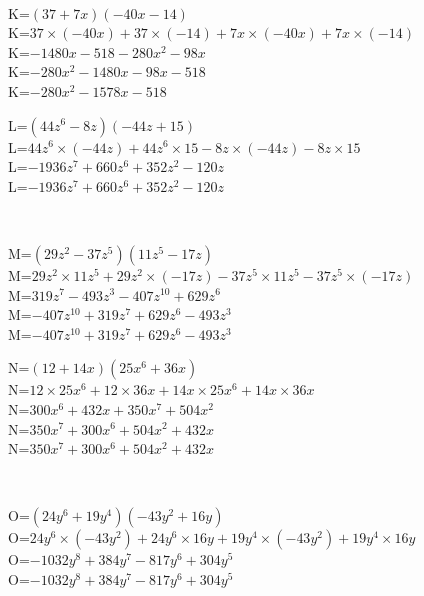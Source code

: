\documentclass{article}%
\begin{document}
\\%
\begin{minipage}{0.5\textwidth}%
K=$(37+7x)(-40x-14)$\\%
K=$37 \times (-40x)+37 \times (-14)+7x \times (-40x)+7x \times (-14)$\\%
K=$-1480x-518-280x^2-98x$\\%
K=$-280x^2-1480x-98x-518$\\%
K=$-280x^2-1578x-518$\\%
\end{minipage}%
\begin{minipage}{0.5\textwidth}%
L=$(44z^6-8z)(-44z+15)$\\%
L=$44z^6 \times (-44z)+44z^6 \times 15-8z \times (-44z)-8z \times 15$\\%
L=$-1936z^7+660z^6+352z^2-120z$\\%
L=$-1936z^7+660z^6+352z^2-120z$\\%
\end{minipage}%
\\%
\begin{minipage}{0.5\textwidth}%
M=$(29z^2-37z^5)(11z^5-17z)$\\%
M=$29z^2 \times 11z^5+29z^2 \times (-17z)-37z^5 \times 11z^5-37z^5 \times (-17z)$\\%
M=$319z^7-493z^3-407z^10+629z^6$\\%
M=$-407z^10+319z^7+629z^6-493z^3$\\%
M=$-407z^10+319z^7+629z^6-493z^3$\\%
\end{minipage}%
\begin{minipage}{0.5\textwidth}%
N=$(12+14x)(25x^6+36x)$\\%
N=$12 \times 25x^6+12 \times 36x+14x \times 25x^6+14x \times 36x$\\%
N=$300x^6+432x+350x^7+504x^2$\\%
N=$350x^7+300x^6+504x^2+432x$\\%
N=$350x^7+300x^6+504x^2+432x$\\%
\end{minipage}%
\\%
\begin{minipage}{0.5\textwidth}%
O=$(24y^6+19y^4)(-43y^2+16y)$\\%
O=$24y^6 \times (-43y^2)+24y^6 \times 16y+19y^4 \times (-43y^2)+19y^4 \times 16y$\\%
O=$-1032y^8+384y^7-817y^6+304y^5$\\%
O=$-1032y^8+384y^7-817y^6+304y^5$\\%
\end{minipage}%
\end{document}
